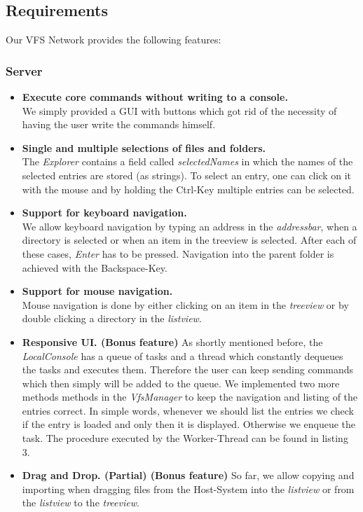 \documentclass[a4paper,12pt]{article}
\begin{document}
\subsection{Requirements}
Our VFS Network provides the following features:

\subsubsection{Server}

\begin{itemize}
\item \textbf{Execute core commands without writing to a console.} \\
	We simply provided a GUI with buttons which got rid of the necessity of having the user write the commands himself.
\item \textbf{Single and multiple selections of files and folders.} \\
	The \emph{Explorer} contains a field called \emph{selectedNames} in which the names of the selected entries are stored (as strings). To select an 			entry, one can click on it with the mouse and by holding the Ctrl-Key multiple entries can be selected.
\item \textbf{Support for keyboard navigation.} \\
	We allow keyboard navigation by typing an address in the \emph{addressbar}, when a directory is selected or when an item in the treeview is selected. 			After 	each of these cases, \emph{Enter} has to be pressed. Navigation into the parent folder is achieved with the Backspace-Key.
\item \textbf{Support for mouse navigation.} \\
	Mouse navigation is done by either clicking on an item in the \emph{treeview} or by double clicking a directory in the \emph{listview}.
\item \textbf {Responsive UI. (Bonus feature)}
	As shortly mentioned before, the \emph{LocalConsole} has a queue of tasks and a thread which constantly dequeues the tasks and executes them. 		Therefore the user can keep sending commands which then simply will be added to the queue. We implemented two more methods methods in 			the \emph{VfsManager} to keep the navigation and listing of the entries correct. In simple words, whenever we should list the entries we check if 			the entry is 	loaded and only then it is displayed. Otherwise we enqueue the task. The procedure executed by the Worker-Thread can be found 			in listing 3.
\item \textbf{Drag and Drop. (Partial) (Bonus feature)}
	So far, we allow copying and importing when dragging files from the Host-System into the \emph{listview} or from the \emph{listview} to the 				\emph{treeview}.
\end{itemize}
\end{document}
